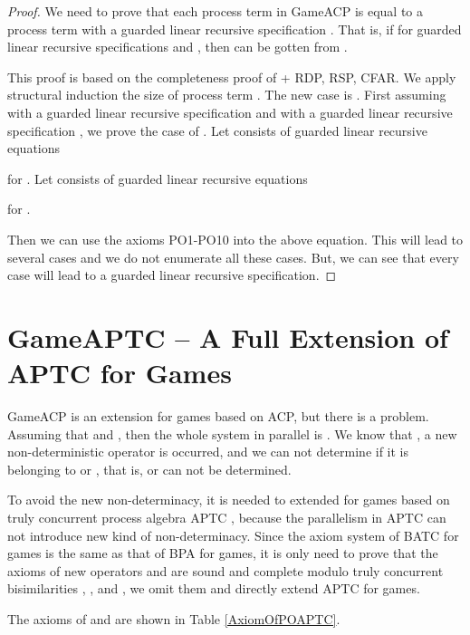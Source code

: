 \documentclass{fac}
\begin{document}
\begin{proof}
We need to prove that each process term  in GameACP is equal to a process term  with a guarded linear recursive specification . That is, if  for guarded linear recursive specifications  and , then  can be gotten from .

This proof is based on the completeness proof\cite{ACP} of  + RDP, RSP, CFAR. We apply structural induction the size of process term . The new case is . First assuming  with a guarded linear recursive specification  and  with a guarded linear recursive specification , we prove the case of . Let  consists of guarded linear recursive equations


for . Let  consists of guarded linear recursive equations


for .



Then we can use the axioms PO1-PO10 into the above equation. This will lead to several cases and we do not enumerate all these cases. But, we can see that every case will lead to a guarded linear recursive specification.
\end{proof}

\section{GameAPTC -- A Full Extension of APTC for Games}

GameACP is an extension for games based on ACP, but there is a problem. Assuming that  and , then the whole system in parallel is . We know that , a new non-deterministic operator  is occurred, and we can not determine if it is belonging to  or , that is,  or  can not be determined.

To avoid the new non-determinacy, it is needed to extended for games based on truly concurrent process algebra APTC \cite{APTC}, because the parallelism in APTC can not introduce new kind of non-determinacy. Since the axiom system of BATC for games is the same as that of BPA for games, it is only need to prove that the axioms of new operators  and  are sound and complete modulo truly concurrent bisimilarities , ,  and , we omit them and directly extend APTC for games.

The axioms of  and  are shown in Table \ref{AxiomOfPOAPTC}.
\end{document}
